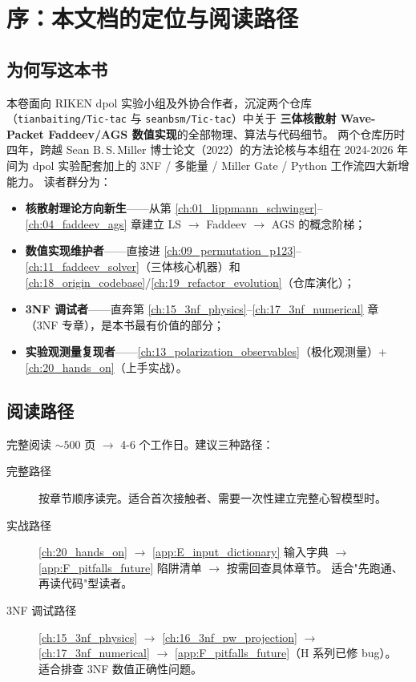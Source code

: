 
\chapter*{序：本文档的定位与阅读路径}

\section*{为何写这本书}

本卷面向 RIKEN dpol 实验小组及外协合作者，沉淀两个仓库
（\texttt{tianbaiting/Tic-tac} 与 \texttt{seanbsm/Tic-tac}）中关于
\textbf{三体核散射 Wave-Packet Faddeev/AGS 数值实现}的全部物理、算法与代码细节。
两个仓库历时四年，跨越 Sean B.\,S.\,Miller 博士论文（2022）的方法论核与本组在
2024-2026 年间为 dpol 实验配套加上的 3NF / 多能量 / Miller Gate / Python 工作流四大新增能力。
读者群分为：

\begin{itemize}
  \item \textbf{核散射理论方向新生}——从第 \cref{ch:01_lippmann_schwinger}–\cref{ch:04_faddeev_ags} 章建立 LS \(\to\) Faddeev \(\to\) AGS 的概念阶梯；
  \item \textbf{数值实现维护者}——直接进 \cref{ch:09_permutation_p123}–\cref{ch:11_faddeev_solver}（三体核心机器）和 \cref{ch:18_origin_codebase}/\cref{ch:19_refactor_evolution}（仓库演化）；
  \item \textbf{3NF 调试者}——直奔第 \cref{ch:15_3nf_physics}–\cref{ch:17_3nf_numerical} 章（3NF 专章），是本书最有价值的部分；
  \item \textbf{实验观测量复现者}——\cref{ch:13_polarization_observables}（极化观测量）+ \cref{ch:20_hands_on}（上手实战）。
\end{itemize}

\section*{阅读路径}

完整阅读 \(\sim 500\) 页 \(\to\) 4-6 个工作日。建议三种路径：

\begin{description}
  \item[完整路径] 按章节顺序读完。适合首次接触者、需要一次性建立完整心智模型时。
  \item[实战路径] \cref{ch:20_hands_on} \(\to\) \cref{app:E_input_dictionary} 输入字典 \(\to\) \cref{app:F_pitfalls_future} 陷阱清单 \(\to\) 按需回查具体章节。
        适合"先跑通、再读代码"型读者。
  \item[3NF 调试路径] \cref{ch:15_3nf_physics} \(\to\) \cref{ch:16_3nf_pw_projection} \(\to\) \cref{ch:17_3nf_numerical} \(\to\) \cref{app:F_pitfalls_future}（H 系列已修 bug）。
        适合排查 3NF 数值正确性问题。
\end{description}

